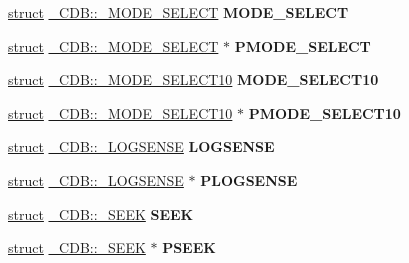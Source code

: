 \begin{DoxyCompactItemize}
\hyperlink{interfacestruct}{struct} \hyperlink{struct___c_d_b_1_1___m_o_d_e___s_e_l_e_c_t}{\+\_\+\+C\+D\+B\+::\+\_\+\+M\+O\+D\+E\+\_\+\+S\+E\+L\+E\+CT} {\bfseries M\+O\+D\+E\+\_\+\+S\+E\+L\+E\+CT}
\item 
\mbox{\label{union___c_d_b_abdb88996ef4e34db65a61dc500618b39}} 
\hyperlink{interfacestruct}{struct} \hyperlink{struct___c_d_b_1_1___m_o_d_e___s_e_l_e_c_t}{\+\_\+\+C\+D\+B\+::\+\_\+\+M\+O\+D\+E\+\_\+\+S\+E\+L\+E\+CT} $\ast$ {\bfseries P\+M\+O\+D\+E\+\_\+\+S\+E\+L\+E\+CT}
\item 
\mbox{\label{union___c_d_b_ac60735fcca76155ec5cd4bd3ed030ae9}} 
\hyperlink{interfacestruct}{struct} \hyperlink{struct___c_d_b_1_1___m_o_d_e___s_e_l_e_c_t10}{\+\_\+\+C\+D\+B\+::\+\_\+\+M\+O\+D\+E\+\_\+\+S\+E\+L\+E\+C\+T10} {\bfseries M\+O\+D\+E\+\_\+\+S\+E\+L\+E\+C\+T10}
\item 
\mbox{\label{union___c_d_b_ad374bed60c7c913ea5e8bdec35baa875}} 
\hyperlink{interfacestruct}{struct} \hyperlink{struct___c_d_b_1_1___m_o_d_e___s_e_l_e_c_t10}{\+\_\+\+C\+D\+B\+::\+\_\+\+M\+O\+D\+E\+\_\+\+S\+E\+L\+E\+C\+T10} $\ast$ {\bfseries P\+M\+O\+D\+E\+\_\+\+S\+E\+L\+E\+C\+T10}
\item 
\mbox{\label{union___c_d_b_a5c5ca05d4e379e8d60215ef7d186cd12}} 
\hyperlink{interfacestruct}{struct} \hyperlink{struct___c_d_b_1_1___l_o_g_s_e_n_s_e}{\+\_\+\+C\+D\+B\+::\+\_\+\+L\+O\+G\+S\+E\+N\+SE} {\bfseries L\+O\+G\+S\+E\+N\+SE}
\item 
\mbox{\label{union___c_d_b_a716f5d4142757e16e6ddfe149acaf9c0}} 
\hyperlink{interfacestruct}{struct} \hyperlink{struct___c_d_b_1_1___l_o_g_s_e_n_s_e}{\+\_\+\+C\+D\+B\+::\+\_\+\+L\+O\+G\+S\+E\+N\+SE} $\ast$ {\bfseries P\+L\+O\+G\+S\+E\+N\+SE}
\item 
\mbox{\label{union___c_d_b_ad9a41ee19767cbf794c0ce838661cfad}} 
\hyperlink{interfacestruct}{struct} \hyperlink{struct___c_d_b_1_1___s_e_e_k}{\+\_\+\+C\+D\+B\+::\+\_\+\+S\+E\+EK} {\bfseries S\+E\+EK}
\item 
\mbox{\label{union___c_d_b_aee549c9b109fbf0806d910e44c96129f}} 
\hyperlink{interfacestruct}{struct} \hyperlink{struct___c_d_b_1_1___s_e_e_k}{\+\_\+\+C\+D\+B\+::\+\_\+\+S\+E\+EK} $\ast$ {\bfseries P\+S\+E\+EK}

\end{DoxyCompactItemize}
